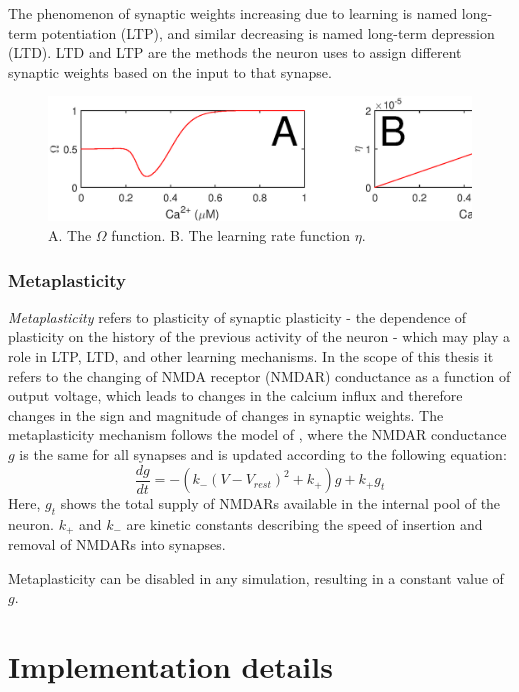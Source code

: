 \documentclass[a4paper,12pt]{report}
\theoremstyle{definition}
\begin{document}
The phenomenon of synaptic weights increasing due to learning is named long-term potentiation (LTP), and similar decreasing is named long-term depression (LTD). LTD and LTP are the methods the neuron uses to assign different synaptic weights based on the input to that synapse.

\begin{figure}[h]
    \includegraphics[width=\textwidth]{figures/methods_eta_omega.eps}
    \caption{A. The $\Omega$ function. B. The learning rate function $\eta$.}
    \label{fig:methods_eta_omega}
\end{figure}


\subsubsection{Metaplasticity}
\emph{Metaplasticity} refers to plasticity of synaptic plasticity - the dependence of plasticity on the history of the previous activity of the neuron - which may play a role in LTP, LTD, and other learning mechanisms. In the scope of this thesis it refers to the changing of NMDA receptor (NMDAR) conductance as a function of output voltage, which leads to changes in the calcium influx and therefore changes in the sign and magnitude of changes in synaptic weights. The metaplasticity mechanism follows the model of \cite{yeung2004synaptic}, where the NMDAR conductance $g$ is the same for all synapses and is updated according to the following equation: $$ \frac{dg}{dt}=-(k_- (V-V_{rest})^2 + k_+)g + k_+ g_t $$
Here, $g_t$ shows the total supply of NMDARs available in the internal pool of the neuron. $k_+$ and $k_-$ are kinetic constants describing the speed of insertion and removal of NMDARs into synapses.

Metaplasticity can be disabled in any simulation, resulting in a constant value of $g$.





\section{Implementation details}
\end{document}
